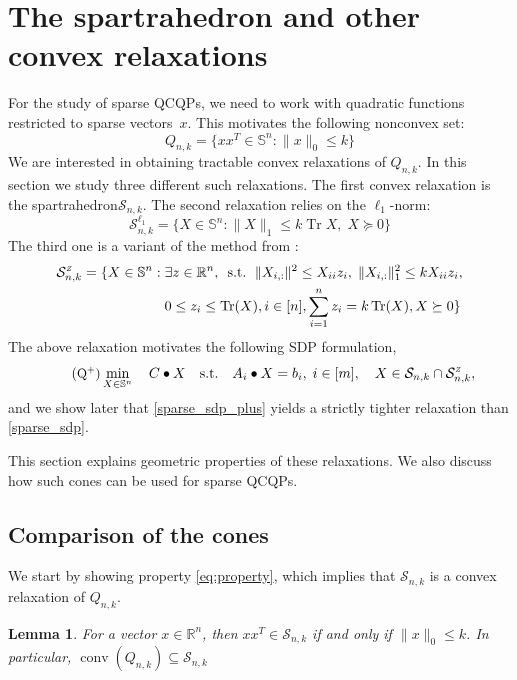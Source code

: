 \documentclass[11pt]{amsart}
\newcommand{\ourset}{spartrahedron\xspace}
\newcommand{\Szero}[2]{\ensuremath{\mathcal{S}_{#1,#2}}}
\newcommand{\Sone}[2]{\ensuremath{\mathcal{S}_{#1,#2}^{\ell_1}}}
\newcommand{\Sz}[2]{\ensuremath{\mathcal{S}_{#1,#2}^{\textit{\tiny{Z}}}}}
\theoremstyle{plain}
\newtheorem{lem}{Lemma}[section]
\theoremstyle{definition}
\theoremstyle{remark}
\newcommand{\RR}{\mathbb{R}}
\renewcommand{\SS}{{\mathbb{S}}}
\newcommand{\st}{\text{\, s.t.\, }}
\DeclareMathOperator{\conv}{conv}
\DeclareMathOperator{\tr}{Tr}
\begin{document}
	
	\section{The \ourset and other convex relaxations}\label{section:ourset}
	
	
	For the study of sparse QCQPs,
	we need to work with quadratic functions restricted to sparse vectors~$x$.
	This motivates the following nonconvex set:
	\[
	Q_{n,k} = \{xx^T\in\SS^n: \|x\|_0\leq k\}
	\]
	We are interested in obtaining tractable convex relaxations of $Q_{n,k}$.
	In this section we study three different such relaxations.
	The first convex relaxation is the \ourset $\Szero{n}{k}$.
	The second relaxation relies on the $\ell_1$-norm:
	\[
	\Sone{n}{k} =
	\{X\in \mathbb{S}^n : \|X\|_1 \leq k \tr X, \; X \succeq 0\}
	\]
	The third one is a variant of the method from \cite{li2025exact}:
	\begin{equation*}
		\begin{split}
			\Sz{n}{k} = \{X\in\SS^n:\; 
			&\exists z\in \RR^n,\st \|X_{i,:}\|^2\leq X_{ii}z_i,\;\|X_{i,:}\|_1^2\leq kX_{ii}z_i,\\
			&0\leq z_i\leq \tr(X), i\in[n], \sum_{i=1}^n z_i = k \tr(X),X\succeq 0\}
		\end{split}
	\end{equation*}
    The above relaxation motivates the following SDP formulation, 
    \begin{equation}\label{sparse_sdp_plus}\tag{\small{\(\text{Q}^+\)}}
		\min_{X \in \mathbb{S}^n}\quad C \bullet X
		\quad\text{s.t.}\quad A_i \bullet X = b_i,\;  i \in [m],\quad
		X\in \Szero{n}{k}\cap\Sz{n}{k},
	\end{equation}
    and we show later that \eqref{sparse_sdp_plus} yields a strictly tighter relaxation than \eqref{sparse_sdp}.
    
    This section explains geometric properties of these relaxations. We also discuss how such cones can be used for sparse QCQPs.
	
	\subsection{Comparison of the cones}
	
	We start by showing property \eqref{eq:property}, which implies that $\Szero{n}{k}$ is a convex relaxation of $Q_{n,k}$.
	
	\begin{lem} \label{lem:cardinality}
		For a vector $x\in \RR^n$, then $x x^T \in \Szero{n}{k}$ if and only if $\|x\|_0\leq k$. 
		In particular,
		\(
		\conv(Q_{n,k}) \subseteq \Szero{n}{k}
		\) 
	\end{lem}
	
\end{document}
